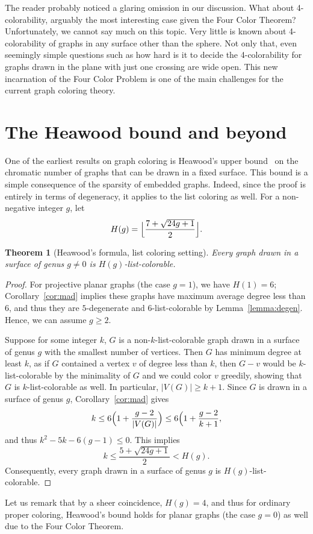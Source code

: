 \documentclass[12pt,twoside,openright,a4paper]{book}
\newtheorem{theorem}{Theorem}[chapter]
\begin{document}
The reader probably noticed a glaring omission in our discussion.  What about 4-colorability, arguably the most interesting case given the Four Color Theorem?
Unfortunately, we cannot say much on this topic.  Very little is known about 4-colorability of graphs in any surface other than the sphere.  Not only that,
even seemingly simple questions such as how hard is it to decide the 4-colorability for graphs drawn in the plane with just one crossing are wide open.
This new incarnation of the Four Color Problem is one of the main challenges for the current graph coloring theory.

\section{The Heawood bound and beyond}\label{sec:heawood}

One of the earliest results on graph coloring is Heawood's upper bound~\cite{heawood} on the chromatic number
of graphs that can be drawn in a fixed surface.  This bound is a simple consequence of the sparsity of embedded graphs.
Indeed, since the proof is entirely in terms of degeneracy, it applies to the list coloring as well.
For a non-negative integer $g$,
let $$H(g)=\Bigl\lfloor\frac{7+\sqrt{24g+1}}{2}\Bigl\rfloor.$$
\begin{theorem}[Heawood's formula, list coloring setting]\label{thm:listheawood}
Every graph drawn in a surface of genus $g\neq 0$ is $H(g)$-list-colorable.
\end{theorem}
\begin{proof}
For projective planar graphs (the case $g=1$), we have $H(1)=6$; Corollary~\ref{cor:mad} implies these graphs have maximum
average degree less than $6$, and thus they are $5$-degenerate and $6$-list-colorable by Lemma~\ref{lemma:degen}.
Hence, we can assume $g\ge 2$.

Suppose for some integer $k$, $G$ is a non-$k$-list-colorable graph drawn in a surface of genus $g$ with the smallest number of vertices.
Then $G$ has minimum degree at least $k$, as if $G$ contained a vertex $v$ of degree less than $k$, then $G-v$ would be $k$-list-colorable
by the minimality of $G$ and we could color $v$ greedily, showing that $G$ is $k$-list-colorable as well.  In particular, $|V(G)|\ge k+1$.
Since $G$ is drawn in a surface of genus $g$, Corollary~\ref{cor:mad} gives
$$k\le 6\Bigl(1+\frac{g-2}{|V(G)|}\Bigr)\le 6\Bigl(1+\frac{g-2}{k+1},$$
and thus $k^2-5k-6(g-1)\le 0$.  This implies $$k\le \frac{5+\sqrt{24g+1}}{2}<H(g).$$
Consequently, every graph drawn in a surface of genus $g$ is $H(g)$-list-colorable.
\end{proof}
Let us remark that by a sheer coincidence, $H(g)=4$, and thus for ordinary proper coloring, Heawood's bound holds for planar graphs (the case $g=0$)
as well due to the Four Color Theorem.
\end{document}
